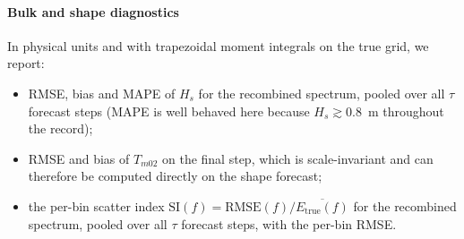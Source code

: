 \paragraph{Bulk and shape diagnostics}
In physical units and with trapezoidal moment integrals on the true grid, we report:
\begin{itemize}
  \item RMSE, bias and MAPE of $H_s$ for the recombined spectrum, pooled over all $\tau$ forecast steps (MAPE is well behaved here because $H_s \gtrsim 0.8$~m throughout the record);
  \item RMSE and bias of $T_{m02}$ on the final step, which is scale-invariant and can therefore be computed directly on the shape forecast;
  \item the per-bin scatter index $\mathrm{SI}(f) = \mathrm{RMSE}(f)/\overline{E_{\text{true}}(f)}$ for the recombined spectrum, pooled over all $\tau$ forecast steps, with the per-bin RMSE.
\end{itemize}

